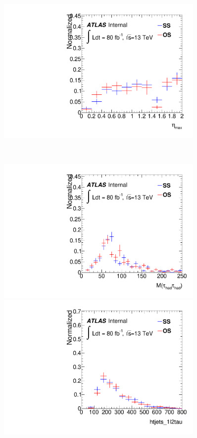 \begin{figure}[htp]
\begin{minipage}[t]{0.33\linewidth}
\end{minipage}
\begin{minipage}[t]{0.33\linewidth}
\centering
\includegraphics[width=0.9\textwidth,angle=-90]{fig/OSvsSS_all/maxeta_F.pdf}
\end{minipage}\\
\begin{minipage}[t]{0.33\linewidth}
\centering
\includegraphics[width=0.9\textwidth,angle=-90]{fig/OSvsSS_all/mtautau_1l2tau_F.pdf}
\end{minipage}
\begin{minipage}[t]{0.33\linewidth}
\centering
\includegraphics[width=0.9\textwidth,angle=-90]{fig/OSvsSS_all/htjets_1l2tau_F.pdf}

\end{minipage}
\end{figure}
